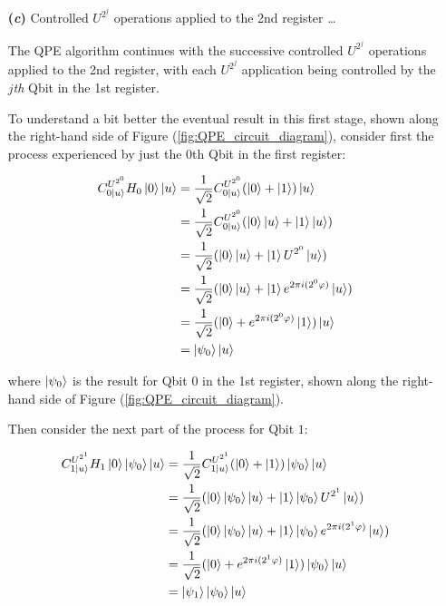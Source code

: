 \documentclass{article}
\begin{document}
\begin{enumerate}[label=\textbf{(\arabic*)}]
\begin{itemize}
  \vspace{0.05in}
  
  \item[\textbf{(\textit{c})}] Controlled $U^{2^j}$ operations applied to the 2nd register \ldots
  
  \vspace{0.05in}
  
  The QPE algorithm continues with the successive controlled $U^{2^j}$ operations applied to the 2nd register, with each $U^{2^j}$ application being controlled by the $j$\textit{th} Qbit in the 1st register.
  
  \vspace{0.05in}
  
  To understand a bit better the eventual result in this first stage, shown along the right-hand side of Figure (\ref{fig:QPE_circuit_diagram}), consider first the process experienced by just the $0$th Qbit in the first register:
  
  \begin{align}
      C_{0\ket{u}}^{U^{2^0}}H_{0}\ket{0}\ket{u}
      &=
      \frac{1}{\sqrt{2}}C_{0\ket{u}}^{U^{2^0}}(\ket{0} + \ket{1})\ket{u}\\
      &=
      \frac{1}{\sqrt{2}}C_{0\ket{u}}^{U^{2^0}}(\ket{0}\ket{u} + \ket{1}\ket{u})\\
      &=
      \frac{1}{\sqrt{2}}(\ket{0}\ket{u} + \ket{1}U^{2^0}\ket{u})\\
      &=
      \frac{1}{\sqrt{2}}(\ket{0}\ket{u} + \ket{1}e^{2\pi i (2^0 \varphi)}\ket{u})\\
      &=
      \frac{1}{\sqrt{2}}(\ket{0} + e^{2\pi i (2^0 \varphi)}\ket{1})\ket{u}\\
      &=
      \ket{\psi_0}\ket{u}
  \end{align}

where $\ket{\psi_0}$ is the result for Qbit $0$ in the 1st register, shown along the right-hand side of Figure (\ref{fig:QPE_circuit_diagram}).

Then consider the next part of the process for Qbit $1$:

\begin{align}
      C_{1\ket{u}}^{U^{2^1}}H_{1}\ket{0}\ket{\psi_0}\ket{u}
      &=
      \frac{1}{\sqrt{2}}
      C_{1\ket{u}}^{U^{2^1}}(\ket{0}+\ket{1})\ket{\psi_0}\ket{u}\\
      &=
      \frac{1}{\sqrt{2}}
      (\ket{0}\ket{\psi_0}\ket{u}+\ket{1}\ket{\psi_0}U^{2^1}\ket{u})\\
      &=
      \frac{1}{\sqrt{2}}
      (\ket{0}\ket{\psi_0}\ket{u}+\ket{1}\ket{\psi_0}e^{2\pi i (2^1 \varphi)}\ket{u})\\
      &=
      \frac{1}{\sqrt{2}}
      (\ket{0}+e^{2\pi i (2^1 \varphi)}\ket{1})\ket{\psi_0}\ket{u}\\
      &=
      \ket{\psi_1}\ket{\psi_0}\ket{u}
  \end{align}
  

\end{itemize}
\end{enumerate}
\end{document}
